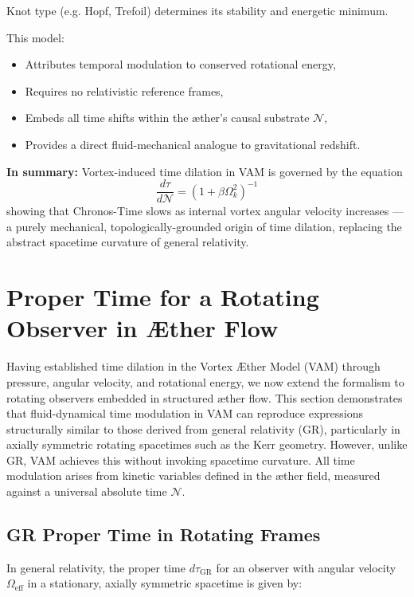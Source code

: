 \documentclass[preprint]{revtex4-2}
\begin{document}
Knot type (e.g. Hopf, Trefoil) determines its stability and energetic minimum.

This model:

\begin{itemize}
    \item Attributes temporal modulation to conserved rotational energy,
    \item Requires no relativistic reference frames,
    \item Embeds all time shifts within the æther’s causal substrate $\mathcal{N}$,
    \item Provides a direct fluid-mechanical analogue to gravitational redshift.
\end{itemize}

\textbf{In summary:} Vortex-induced time dilation in VAM is governed by the equation
\[
    \frac{d\tau}{d\mathcal{N}} = \left(1 + \beta \Omega_k^2 \right)^{-1}
\]
showing that Chronos-Time slows as internal vortex angular velocity increases — a purely mechanical, topologically-grounded origin of time dilation, replacing the abstract spacetime curvature of general relativity.

\section{Proper Time for a Rotating Observer in Æther Flow}

Having established time dilation in the Vortex Æther Model (VAM) through pressure, angular velocity, and rotational energy, we now extend the formalism to rotating observers embedded in structured æther flow. This section demonstrates that fluid-dynamical time modulation in VAM can reproduce expressions structurally similar to those derived from general relativity (GR), particularly in axially symmetric rotating spacetimes such as the Kerr geometry. However, unlike GR, VAM achieves this without invoking spacetime curvature. All time modulation arises from kinetic variables defined in the æther field, measured against a universal absolute time \( \mathcal{N} \).

\subsection{GR Proper Time in Rotating Frames}

In general relativity, the proper time \( d\tau_{\text{GR}} \) for an observer with angular velocity \( \Omega_\text{eff} \) in a stationary, axially symmetric spacetime is given by:
\end{document}
